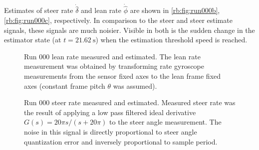 Estimates of steer rate $\dot{\hat{\delta}}$ and lean rate $\dot{\hat{\phi}}$ are
shown in \autoref{rb:fig:run000b}, \autoref{rb:fig:run000c}, respectively. In
comparison to the steer and steer estimate signals, these signals are much
noisier. Visible in both is the sudden change in the estimator state (at
$t = \SI{21.62}{\s}$) when the estimation threshold speed is reached.
\begin{figure}[htbp]
  \pgfplotsset{set layers}
  \runzerosecondplot
  \centering
  \caption[Run 000 lean rate measured and estimated.]{Run 000 lean rate
    measured and estimated. The lean rate measurement was obtained by
    transforming rate gyroscope measurements from the sensor fixed axes to the
    lean frame fixed axes (constant frame pitch $\theta$ was assumed).}
  \label{rb:fig:run000b}
\end{figure}
\begin{figure}[htbp]
  \runzerothirdplot
  \pgfplotsset{set layers}
  \centering
  \caption[Run 000 steer rate measured and estimated.]{Run 000 steer rate
    measured and estimated. Measured steer rate was the result of applying a
    low pass filtered ideal derivative $G(s) = 20\pi s/(s+20\pi)$ to the steer
    angle measurement. The noise in this signal is directly proportional to
    steer angle quantization error and inversely proportional to sample period.}
  \label{rb:fig:run000c}
\end{figure}
